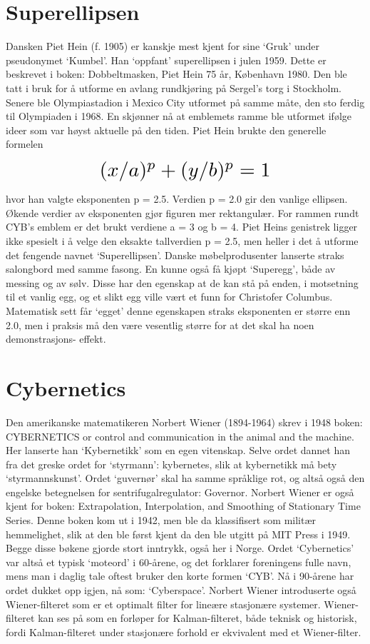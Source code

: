 \documentclass[../../main.tex]{subfiles}
\begin{document}

\section{Superellipsen}

Dansken Piet Hein (f. 1905) er kanskje mest kjent for sine `Gruk' under pseudonymet `Kumbel'. Han `oppfant' superellipsen i julen 1959. Dette er beskrevet i boken: Dobbeltmasken, Piet Hein 75 år, København 1980. Den ble tatt i bruk for å utforme en avlang rundkjøring på Sergel's torg i Stockholm. Senere ble Olympiastadion i Mexico City utformet på samme måte, den sto ferdig til Olympiaden i 1968. En skjønner nå at emblemets ramme ble utformet ifølge ideer som var høyst aktuelle på den tiden. Piet Hein brukte den generelle formelen

\[ \scalebox{2}{$(x / a)^p + (y / b)^p = 1$} \]

hvor han valgte eksponenten p = 2.5. Verdien p = 2.0 gir den vanlige ellipsen. Økende verdier av eksponenten gjør figuren mer rektangulær. For rammen rundt CYB's emblem er det brukt verdiene a = 3 og b = 4. Piet Heins genistrek ligger ikke spesielt i å velge den eksakte tallverdien p = 2.5, men heller i det å utforme det fengende navnet `Superellipsen'. Danske møbelprodusenter lanserte straks salongbord med samme fasong. En kunne også få kjøpt `Superegg', både av messing og av sølv. Disse har den egenskap at de kan stå på enden, i motsetning til et vanlig egg, og et slikt egg ville vært et funn for Christofer Columbus. Matematisk sett får `egget' denne egenskapen straks eksponenten er større enn 2.0, men i praksis må den være vesentlig større for at det skal ha noen demonstrasjons- effekt.

\section{Cybernetics}

Den amerikanske matematikeren Norbert Wiener (1894-1964) skrev i 1948 boken: CYBERNETICS or control and communication in the animal and the machine. Her lanserte han `Kybernetikk' som en egen vitenskap. Selve ordet dannet han fra det greske ordet for `styrmann': kybernetes, slik at kybernetikk må bety `styrmannskunst'. Ordet `guvernør' skal ha samme språklige rot, og altså også den engelske betegnelsen for sentrifugalregulator: Governor. Norbert Wiener er også kjent for boken: Extrapolation, Interpolation, and Smoothing of Stationary Time Series. Denne boken kom ut i 1942, men ble da klassifisert som militær hemmelighet, slik at den ble først kjent da den ble utgitt på MIT Press i 1949. Begge disse bøkene gjorde stort inntrykk, også her i Norge. Ordet `Cybernetics' var altså et typisk `moteord' i 60-årene, og det forklarer foreningens fulle navn, mens man i daglig tale oftest bruker den korte formen `CYB'. Nå i 90-årene har ordet dukket opp igjen, nå som: `Cyberspace'. Norbert Wiener introduserte også Wiener-filteret som er et optimalt filter for lineære stasjonære systemer. Wiener-filteret kan ses på som en forløper for Kalman-filteret, både teknisk og historisk, fordi Kalman-filteret under stasjonære forhold er ekvivalent med et Wiener-filter.
\end{document}
